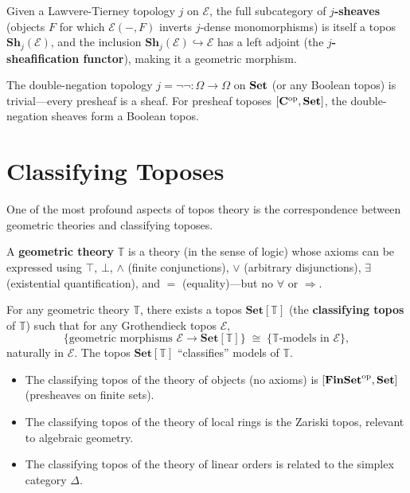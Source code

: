 \begin{theorem}
Given a Lawvere-Tierney topology $j$ on $\mathcal{E}$, the full subcategory of \textbf{$j$-sheaves} (objects $F$ for which $\mathcal{E}(-, F)$ inverts $j$-dense monomorphisms) is itself a topos $\mathbf{Sh}_j(\mathcal{E})$, and the inclusion $\mathbf{Sh}_j(\mathcal{E}) \hookrightarrow \mathcal{E}$ has a left adjoint (the \textbf{$j$-sheafification functor}), making it a geometric morphism.
\end{theorem}

\begin{example}
The double-negation topology $j = \neg\neg: \Omega \to \Omega$ on $\mathbf{Set}$ (or any Boolean topos) is trivial—every presheaf is a sheaf. For presheaf toposes $[\mathbf{C}^{\mathrm{op}},\mathbf{Set}]$, the double-negation sheaves form a Boolean topos.
\end{example}

\section{Classifying Toposes}

One of the most profound aspects of topos theory is the correspondence between geometric theories and classifying toposes.

\begin{definition}
A \textbf{geometric theory} $\mathbb{T}$ is a theory (in the sense of logic) whose axioms can be expressed using $\top$, $\bot$, $\wedge$ (finite conjunctions), $\vee$ (arbitrary disjunctions), $\exists$ (existential quantification), and $=$ (equality)—but no $\forall$ or $\Rightarrow$.
\end{definition}

\begin{theorem}
For any geometric theory $\mathbb{T}$, there exists a topos $\mathbf{Set}[\mathbb{T}]$ (the \textbf{classifying topos} of $\mathbb{T}$) such that for any Grothendieck topos $\mathcal{E}$,
\[
  \{\text{geometric morphisms } \mathcal{E} \to \mathbf{Set}[\mathbb{T}]\} \;\cong\; \{\mathbb{T}\text{-models in } \mathcal{E}\},
\]
naturally in $\mathcal{E}$. The topos $\mathbf{Set}[\mathbb{T}]$ ``classifies'' models of $\mathbb{T}$.
\end{theorem}

\begin{example}
\begin{itemize}
  \item The classifying topos of the theory of objects (no axioms) is $[\mathbf{FinSet}^{\mathrm{op}}, \mathbf{Set}]$ (presheaves on finite sets).
  \item The classifying topos of the theory of local rings is the Zariski topos, relevant to algebraic geometry.
  \item The classifying topos of the theory of linear orders is related to the simplex category $\Delta$.
\end{itemize}
\end{example}

